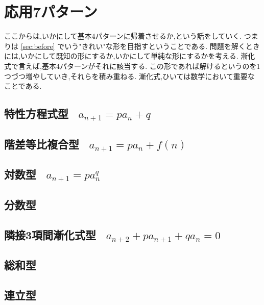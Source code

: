 
\section{応用7パターン}
ここからは,いかにして基本4パターンに帰着させるか,という話をしていく.
つまりは \ref{sec:before} でいう"きれい"な形を目指すということである.
問題を解くときには,いかにして既知の形にするか,いかにして単純な形にするかを考える.
漸化式で言えば,基本4パターンがそれに該当する.
この形であれば解けるというのを1つづつ増やしていき,それらを積み重ねる.
漸化式,ひいては数学において重要なことである.

\subsection{特性方程式型 \, $a_{n+1}=pa_n+q$}


\subsection{階差等比複合型 \, $\displaystyle a_{n+1}=pa_n+f(n)$}


\subsection{対数型 \, $a_{n+1}=pa_n^q$}


\subsection{分数型}


\subsection{隣接3項間漸化式型 \, $\displaystyle a_{n+2}+pa_{n+1}+qa_n=0$}


\subsection{総和型}


\subsection{連立型}

